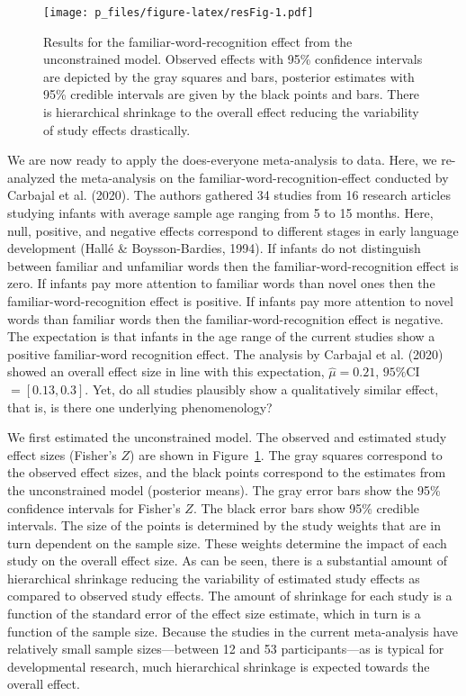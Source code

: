\documentclass[english,,man]{apa6}
\begin{document}
\begin{figure}
\centering
\texttt{[image: p\_files/figure-latex/resFig-1.pdf]}
\caption{\label{fig:resFig}Results for the familiar-word-recognition effect from the unconstrained model. Observed effects with 95\% confidence intervals are depicted by the gray squares and bars, posterior estimates with 95\% credible intervals are given by the black points and bars. There is hierarchical shrinkage to the overall effect reducing the variability of study effects drastically.}
\end{figure}

We are now ready to apply the does-everyone meta-analysis to data. Here, we re-analyzed the meta-analysis on the familiar-word-recognition-effect conducted by Carbajal et al. (2020). The authors gathered 34 studies from 16 research articles studying infants with average sample age ranging from 5 to 15 months. Here, null, positive, and negative effects correspond to different stages in early language development (Hallé \& Boysson-Bardies, 1994). If infants do not distinguish between familiar and unfamiliar words then the familiar-word-recognition effect is zero. If infants pay more attention to familiar words than novel ones then the familiar-word-recognition effect is positive. If infants pay more attention to novel words than familiar words then the familiar-word-recognition effect is negative. The expectation is that infants in the age range of the current studies show a positive familiar-word recognition effect. The analysis by Carbajal et al. (2020) showed an overall effect size in line with this expectation, \(\hat{\mu} = 0.21\), \(95\%\)CI \(= [0.13, 0.3]\). Yet, do all studies plausibly show a qualitatively similar effect, that is, is there one underlying phenomenology?

We first estimated the unconstrained model. The observed and estimated study effect sizes (Fisher's \(Z\)) are shown in Figure~\ref{fig:resFig}. The gray squares correspond to the observed effect sizes, and the black points correspond to the estimates from the unconstrained model (posterior means). The gray error bars show the 95\% confidence intervals for Fisher's \(Z\). The black error bars show 95\% credible intervals. The size of the points is determined by the study weights that are in turn dependent on the sample size. These weights determine the impact of each study on the overall effect size. As can be seen, there is a substantial amount of hierarchical shrinkage reducing the variability of estimated study effects as compared to observed study effects. The amount of shrinkage for each study is a function of the standard error of the effect size estimate, which in turn is a function of the sample size. Because the studies in the current meta-analysis have relatively small sample sizes---between 12 and 53 participants---as is typical for developmental research, much hierarchical shrinkage is expected towards the overall effect.
\end{document}
